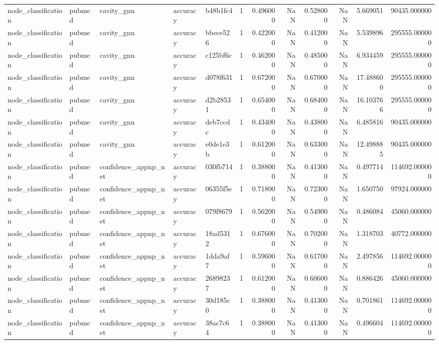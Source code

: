 \begin{tabular}{lllllrrrrrrr}
node_classification & pubmed & cavity_gnn & accuracy & b48b1fc4 & 1 & 0.496000 & NaN & 0.528000 & NaN & 5.669051 & 90435.000000 \\
node_classification & pubmed & cavity_gnn & accuracy & bbece526 & 1 & 0.422000 & NaN & 0.412000 & NaN & 5.539896 & 295555.000000 \\
node_classification & pubmed & cavity_gnn & accuracy & c125bf6c & 1 & 0.462000 & NaN & 0.485000 & NaN & 6.934459 & 295555.000000 \\
node_classification & pubmed & cavity_gnn & accuracy & d078f631 & 1 & 0.672000 & NaN & 0.670000 & NaN & 17.488600 & 295555.000000 \\
node_classification & pubmed & cavity_gnn & accuracy & d2b28531 & 1 & 0.654000 & NaN & 0.684000 & NaN & 16.103766 & 295555.000000 \\
node_classification & pubmed & cavity_gnn & accuracy & deb7ccdc & 1 & 0.434000 & NaN & 0.438000 & NaN & 6.485816 & 90435.000000 \\
node_classification & pubmed & cavity_gnn & accuracy & e0de1e3b & 1 & 0.612000 & NaN & 0.633000 & NaN & 12.498885 & 90435.000000 \\
node_classification & pubmed & confidence_appnp_net & accuracy & 030fb714 & 1 & 0.388000 & NaN & 0.413000 & NaN & 0.497714 & 114692.000000 \\
node_classification & pubmed & confidence_appnp_net & accuracy & 06355f5e & 1 & 0.718000 & NaN & 0.723000 & NaN & 1.650750 & 97924.000000 \\
node_classification & pubmed & confidence_appnp_net & accuracy & 079f8679 & 1 & 0.562000 & NaN & 0.549000 & NaN & 0.486084 & 45060.000000 \\
node_classification & pubmed & confidence_appnp_net & accuracy & 18ad5312 & 1 & 0.676000 & NaN & 0.702000 & NaN & 1.318703 & 40772.000000 \\
node_classification & pubmed & confidence_appnp_net & accuracy & 1dda9af7 & 1 & 0.596000 & NaN & 0.617000 & NaN & 2.497856 & 114692.000000 \\
node_classification & pubmed & confidence_appnp_net & accuracy & 26898237 & 1 & 0.612000 & NaN & 0.606000 & NaN & 0.886426 & 45060.000000 \\
node_classification & pubmed & confidence_appnp_net & accuracy & 30d185c0 & 1 & 0.388000 & NaN & 0.413000 & NaN & 0.701861 & 114692.000000 \\
node_classification & pubmed & confidence_appnp_net & accuracy & 38ac7c64 & 1 & 0.388000 & NaN & 0.413000 & NaN & 0.496604 & 114692.000000 \\

\end{tabular}
